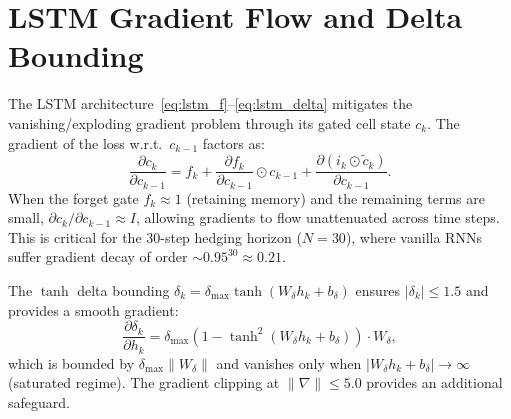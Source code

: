 \documentclass[11pt]{article}
\begin{document}
\section{LSTM Gradient Flow and Delta Bounding}
\label{app:lstm_stability}

The LSTM architecture~\eqref{eq:lstm_f}--\eqref{eq:lstm_delta} mitigates the vanishing/exploding gradient problem through its gated cell state $c_k$.  The gradient of the loss w.r.t.\ $c_{k-1}$ factors as:
\begin{equation}
    \frac{\partial c_k}{\partial c_{k-1}} = f_k + \frac{\partial f_k}{\partial c_{k-1}} \odot c_{k-1} + \frac{\partial(i_k \odot \tilde{c}_k)}{\partial c_{k-1}}.
    \label{eq:cell_grad}
\end{equation}
When the forget gate $f_k \approx 1$ (retaining memory) and the remaining terms are small, $\partial c_k/\partial c_{k-1} \approx I$, allowing gradients to flow unattenuated across time steps.  This is critical for the 30-step hedging horizon ($N=30$), where vanilla RNNs suffer gradient decay of order $\sim 0.95^{30} \approx 0.21$.

The $\tanh$ delta bounding $\delta_k = \delta_{\max}\tanh(W_\delta h_k + b_\delta)$ ensures $|\delta_k| \le 1.5$ and provides a smooth gradient:
\begin{equation}
    \frac{\partial \delta_k}{\partial h_k} = \delta_{\max}(1 - \tanh^2(W_\delta h_k + b_\delta)) \cdot W_\delta,
\end{equation}
which is bounded by $\delta_{\max}\|W_\delta\|$ and vanishes only when $|W_\delta h_k + b_\delta| \to \infty$ (saturated regime).  The gradient clipping at $\|\nabla\| \le 5.0$ provides an additional safeguard.
\end{document}
